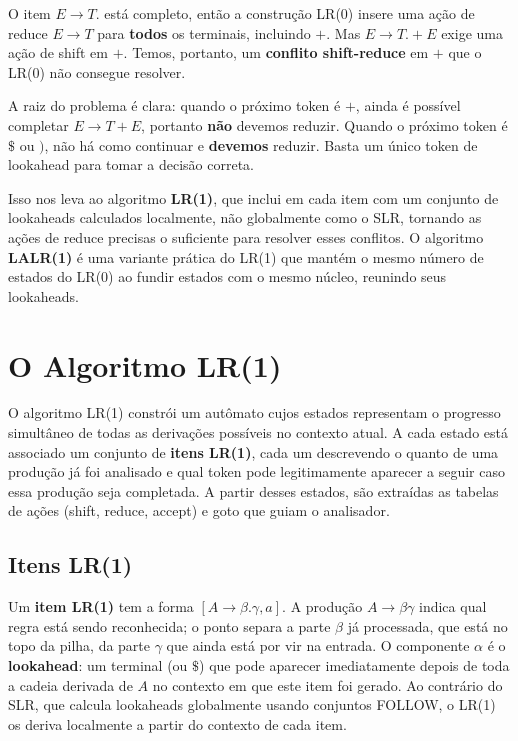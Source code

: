 O item \(E \to T.\) está completo, então a construção LR(0) insere
uma ação de reduce \(E \to T\) para \textbf{todos} os terminais,
incluindo \(+\). Mas \(E \to T . + E\) exige uma ação de shift em
\(+\). Temos, portanto, um \textbf{conflito shift-reduce} em \(+\)
que o LR(0) não consegue resolver.

A raiz do problema é clara: quando o próximo token é \(+\), ainda é
possível completar \(E \to T + E\), portanto \textbf{não} devemos
reduzir. Quando o próximo token é \(\$\) ou \()\), não há como
continuar e \textbf{devemos} reduzir. Basta um único token de
lookahead para tomar a decisão correta.

Isso nos leva ao algoritmo \textbf{LR(1)}, que inclui em cada item
com um conjunto de lookaheads calculados localmente, não
globalmente como o SLR, tornando as ações de reduce precisas o
suficiente para resolver esses conflitos. O algoritmo
\textbf{LALR(1)} é uma variante prática do LR(1) que mantém o mesmo
número de estados do LR(0) ao fundir estados com o mesmo núcleo,
reunindo seus lookaheads.

\section{O Algoritmo LR(1)}

O algoritmo LR(1) constrói um autômato cujos estados representam o
progresso simultâneo de todas as derivações possíveis no contexto
atual. A cada estado está associado um conjunto de \textbf{itens
LR(1)}, cada um descrevendo o quanto de uma produção já foi analisado
e qual token pode legitimamente aparecer a seguir caso essa produção
seja completada. A partir desses estados, são extraídas as tabelas de
ações (shift, reduce, accept) e goto que guiam o analisador.

\subsection{Itens LR(1)}

Um \textbf{item LR(1)} tem a forma \([A \to \beta . \gamma, a]\). A
produção \(A \to \beta \gamma\) indica qual regra está sendo
reconhecida; o ponto separa a parte \(\beta\) já processada, que está
no topo da pilha, da parte \(\gamma\) que ainda está por vir na
entrada. O componente \(\alpha\) é o \textbf{lookahead}: um terminal (ou
\(\$\)) que pode aparecer imediatamente depois de toda a cadeia
derivada de \(A\) no contexto em que este item foi gerado. Ao
contrário do SLR, que calcula lookaheads globalmente usando conjuntos
FOLLOW, o LR(1) os deriva localmente a partir do contexto de cada item.

